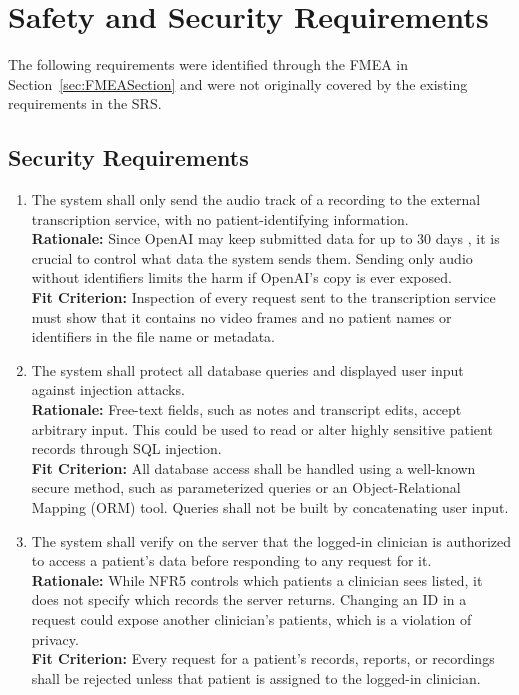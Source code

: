 \documentclass{article}
\begin{document}
\section{Safety and Security Requirements} \label{sec:SafetySecurity}



The following requirements were identified through the FMEA in Section~\ref{sec:FMEASection} and were not originally covered by the existing requirements in the SRS. 

\subsection{Security Requirements}
\begin{enumerate}[label={HA-SER\arabic*.}, ref={HA-SER\arabic*}, leftmargin=*]
    \item \label{HA-SER1} The system shall only send the audio track of a recording to the external transcription service, with no patient-identifying information.\\
    \textbf{Rationale:} Since OpenAI may keep submitted data for up to 30 days \citep{openai-data-controls}, it is crucial to control what data the system sends them. Sending only audio without identifiers limits the harm if OpenAI's copy is ever exposed.\\
    \textbf{Fit Criterion:} Inspection of every request sent to the transcription service must show that it contains no video frames and no patient names or identifiers in the file name or metadata.

    \item \label{HA-SER2} The system shall protect all database queries and displayed user input against injection attacks.\\
    \textbf{Rationale:} Free-text fields, such as notes and transcript edits, accept arbitrary input. This could be used to read or alter highly sensitive patient records through SQL injection.\\
    \textbf{Fit Criterion:} All database access shall be handled using a well-known secure method, such as parameterized queries or an Object-Relational Mapping (ORM) tool. Queries shall not be built by concatenating user input.

    \item \label{HA-SER3} The system shall verify on the server that the logged-in clinician is authorized to access a patient's data before responding to any request for it.\\
    \textbf{Rationale:} While NFR5 controls which patients a clinician sees listed, it does not specify which records the server returns. Changing an ID in a request could expose another clinician's patients, which is a violation of privacy.\\
    \textbf{Fit Criterion:} Every request for a patient's records, reports, or recordings shall be rejected unless that patient is assigned to the logged-in clinician. \end{enumerate}
\end{document}
